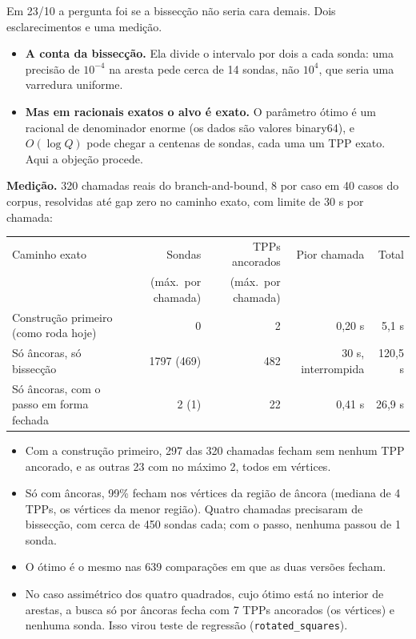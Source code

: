 \documentclass[11pt]{article}
\theoremstyle{plain}
\theoremstyle{remark}
\begin{document}
Em 23/10 a pergunta foi se a bissecção não seria cara demais. Dois esclarecimentos e uma
medição.

\begin{itemize}
\item \textbf{A conta da bissecção.} Ela divide o intervalo por dois a cada sonda: uma
  precisão de $10^{-4}$ na aresta pede cerca de 14 sondas, não $10^4$, que seria uma
  varredura uniforme.
\item \textbf{Mas em racionais exatos o alvo é exato.} O parâmetro ótimo é um racional
  de denominador enorme (os dados são valores binary64), e $O(\log Q)$ pode chegar a
  centenas de sondas, cada uma um TPP exato. Aqui a objeção procede.
\end{itemize}

\textbf{Medição.} 320 chamadas reais do branch-and-bound, 8 por caso em 40 casos do
corpus, resolvidas até gap zero no caminho exato, com limite de 30 s por chamada:

\begin{center}
\small
\begin{tabular}{@{}>{\raggedright\arraybackslash}p{42mm}rrrr@{}}
\toprule
Caminho exato & Sondas & TPPs ancorados & Pior chamada & Total \\
 & (máx.\ por chamada) & (máx.\ por chamada) & & \\
\midrule
Construção primeiro (como roda hoje) & 0 & 2 & 0{,}20 s & 5{,}1 s \\
Só âncoras, só bissecção & 1797 (469) & 482 & 30 s, interrompida & 120{,}5 s \\
Só âncoras, com o passo em forma fechada & 2 (1) & 22 & 0{,}41 s & 26{,}9 s \\
\bottomrule
\end{tabular}
\end{center}

\begin{itemize}
\item Com a construção primeiro, 297 das 320 chamadas fecham sem nenhum TPP ancorado, e as
  outras 23 com no máximo 2, todos em vértices.
\item Só com âncoras, 99\% fecham nos vértices da região de âncora (mediana de 4 TPPs,
  os vértices da menor região). Quatro chamadas precisaram de bissecção, com cerca de 450
  sondas cada; com o passo, nenhuma passou de 1 sonda.
\item O ótimo é o mesmo nas 639 comparações em que as duas versões fecham.
\item No caso assimétrico dos quatro quadrados, cujo ótimo está no interior de arestas,
  a busca só por âncoras fecha com 7 TPPs ancorados (os vértices) e nenhuma sonda. Isso
  virou teste de regressão (\texttt{rotated\_squares}).
\end{itemize}
\end{document}
